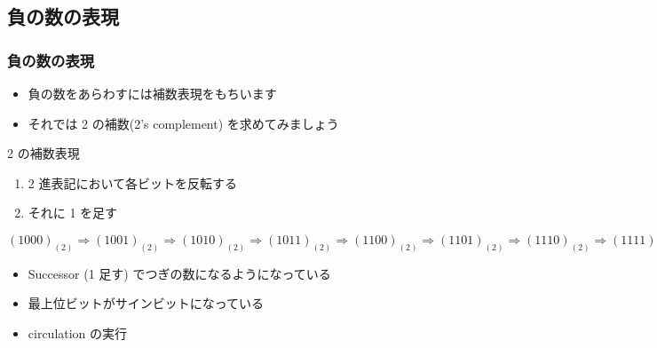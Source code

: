 \subsection{負の数の表現}
\begin{frame}[shrink]
\frametitle{負の数の表現}
  \begin{itemize}
\item 負の数をあらわすには補数表現をもちいます
\item それでは 2 の補数(2's complement) を求めてみましょう
  \end{itemize}
  \begin{block}{2 の補数表現}
    \begin{enumerate}
\item 2 進表記において各ビットを反転する
\item それに 1 を足す
    \end{enumerate}
  \end{block}
  \begin{center}
    \begin{example}
\((1000)_{(2)}\Rightarrow(1001)_{(2)}\Rightarrow(1010)_{(2)}\Rightarrow (1011)_{(2)}\Rightarrow (1100)_{(2)}
\Rightarrow(1101)_{(2)}\Rightarrow(1110)_{(2)}\Rightarrow(1111)_{(2)}
\Rightarrow(0000)_{(2)}\Rightarrow(0001)_{(2)}\Rightarrow(0010)_{(2)}\Rightarrow(0011)_{(2)}
\Rightarrow(0100)_{(2)}\Rightarrow(0101)_{(2)}\Rightarrow(0110)_{(2)}\Rightarrow(0111)_{(2)}\)\\
      \begin{itemize}
\item Successor (1 足す) でつぎの数になるようになっている
\item 最上位ビットがサインビットになっている
\item circulation の実行
      \end{itemize}
    \end{example}
  \end{center}
\end{frame}
